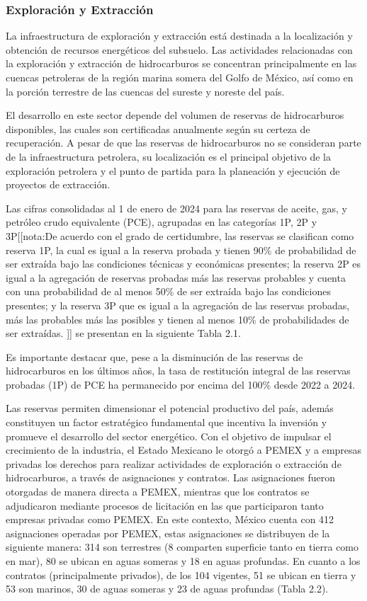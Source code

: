 \documentclass{sener2025}
\begin{document}
\subsubsection{Exploración y Extracción}

La infraestructura de exploración y extracción está destinada a la localización y obtención de recursos energéticos del subsuelo. Las actividades relacionadas con la exploración y extracción de hidrocarburos se concentran principalmente en las cuencas petroleras de la región marina somera del Golfo de México, así como en la porción terrestre de las cuencas del sureste y noreste del país.

El desarrollo en este sector depende del volumen de reservas de hidrocarburos disponibles, las cuales son certificadas anualmente según su certeza de recuperación. A pesar de que las reservas de hidrocarburos no se consideran parte de la infraestructura petrolera, su localización es el principal objetivo de la exploración petrolera y el punto de partida para la planeación y ejecución de proyectos de extracción.

Las cifras consolidadas al 1 de enero de 2024 para las reservas de aceite, gas, y petróleo crudo equivalente (PCE), agrupadas en las categorías 1P, 2P y 3P[[nota:De acuerdo con el grado de certidumbre, las reservas se clasifican como reserva 1P, la cual es igual a la reserva probada y tienen 90\% de probabilidad de ser extraída bajo las condiciones técnicas y económicas presentes; la reserva 2P es igual a la agregación de reservas probadas más las reservas probables y cuenta con una probabilidad de al menos 50\% de ser extraída bajo las condiciones presentes; y la reserva 3P que es igual a la agregación de las reservas probadas, más las probables más las posibles y tienen al menos 10\% de probabilidades de ser extraídas.
]] se presentan en la siguiente Tabla 2.1.


Es importante destacar que, pese a la disminución de las reservas de hidrocarburos en los últimos años, la tasa de restitución integral de las reservas probadas (1P) de PCE ha permanecido por encima del 100\% desde 2022 a 2024.

Las reservas permiten dimensionar el potencial productivo del país, además constituyen un factor estratégico fundamental que incentiva la inversión y promueve el desarrollo del sector energético. Con el objetivo de impulsar el crecimiento de la industria, el Estado Mexicano le otorgó a PEMEX y a empresas privadas los derechos para realizar actividades de exploración o extracción de hidrocarburos, a través de asignaciones y contratos. Las asignaciones fueron otorgadas de manera directa a PEMEX, mientras que los contratos se adjudicaron mediante procesos de licitación en las que participaron tanto empresas privadas como PEMEX. En este contexto, México cuenta con 412 asignaciones operadas por PEMEX, estas asignaciones se distribuyen de la siguiente manera: 314 son terrestres (8 comparten superficie tanto en tierra como en mar), 80 se ubican en aguas someras y 18 en aguas profundas. En cuanto a los contratos (principalmente privados), de los 104 vigentes, 51 se ubican en tierra y 53 son marinos, 30 de aguas someras y 23 de aguas profundas (Tabla 2.2).
\end{document}
